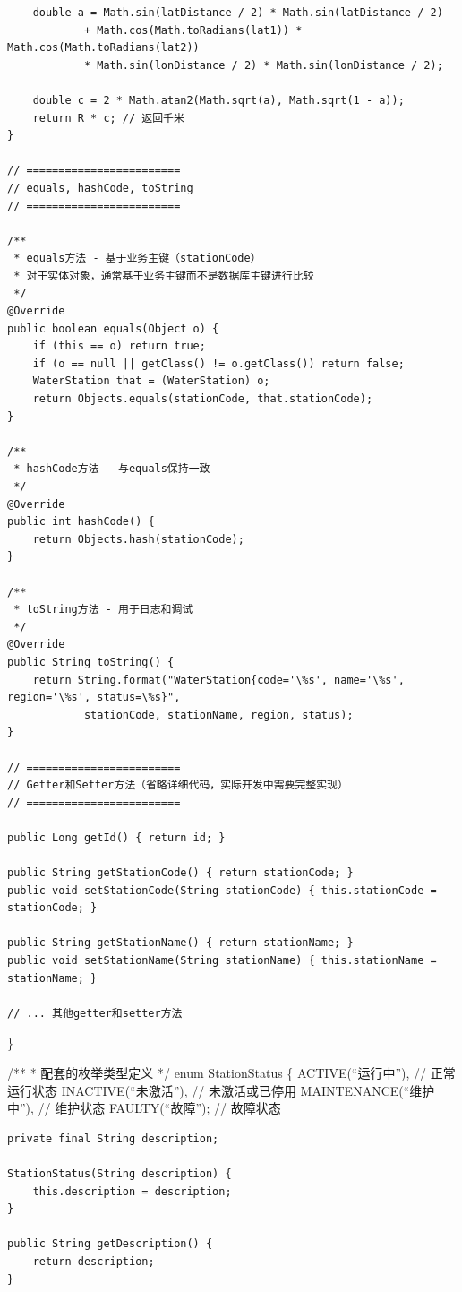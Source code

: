 \begin{verbatim}
    double a = Math.sin(latDistance / 2) * Math.sin(latDistance / 2)
            + Math.cos(Math.toRadians(lat1)) * Math.cos(Math.toRadians(lat2))
            * Math.sin(lonDistance / 2) * Math.sin(lonDistance / 2);
    
    double c = 2 * Math.atan2(Math.sqrt(a), Math.sqrt(1 - a));
    return R * c; // 返回千米
}

// ========================
// equals, hashCode, toString
// ========================

/**
 * equals方法 - 基于业务主键（stationCode）
 * 对于实体对象，通常基于业务主键而不是数据库主键进行比较
 */
@Override
public boolean equals(Object o) {
    if (this == o) return true;
    if (o == null || getClass() != o.getClass()) return false;
    WaterStation that = (WaterStation) o;
    return Objects.equals(stationCode, that.stationCode);
}

/**
 * hashCode方法 - 与equals保持一致
 */
@Override
public int hashCode() {
    return Objects.hash(stationCode);
}

/**
 * toString方法 - 用于日志和调试
 */
@Override
public String toString() {
    return String.format("WaterStation{code='\%s', name='\%s', region='\%s', status=\%s}",
            stationCode, stationName, region, status);
}

// ========================
// Getter和Setter方法（省略详细代码，实际开发中需要完整实现）
// ========================

public Long getId() { return id; }

public String getStationCode() { return stationCode; }
public void setStationCode(String stationCode) { this.stationCode = stationCode; }

public String getStationName() { return stationName; }
public void setStationName(String stationName) { this.stationName = stationName; }

// ... 其他getter和setter方法
\end{verbatim}

\}

/** * 配套的枚举类型定义 */ enum StationStatus \{ ACTIVE(``运行中''), // 正常运行状态 INACTIVE(``未激活''), // 未激活或已停用 MAINTENANCE(``维护中''), // 维护状态 FAULTY(``故障''); // 故障状态

\begin{verbatim}
private final String description;

StationStatus(String description) {
    this.description = description;
}

public String getDescription() {
    return description;
}
\end{verbatim}

